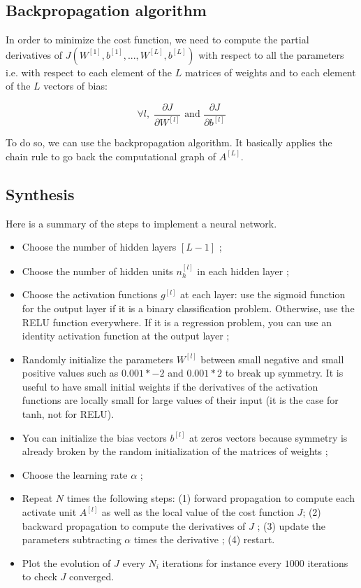 \documentclass[a4paper, 12pt]{article}
\begin{document}
\subsection{Backpropagation algorithm}

In order to minimize the cost function, we need to compute the partial derivatives of $J(W^{[1]}, b^{[1]}, ..., W^{[L]}, b^{[L]})$ with respect to all the parameters i.e. with respect to each element of the $L$ matrices of weights and to each element of the $L$ vectors of bias:

\begin{equation}
\forall l, \; \frac{\partial J}{\partial W^{[l]}} \text{ and } \frac{\partial J}{\partial b^{[l]}}
\end{equation}

To do so, we can use the backpropagation algorithm. It basically applies the chain rule to go back the computational graph of $A^{[L]}$.

\subsection{Synthesis}

Here is a summary of the steps to implement a neural network.

\begin{itemize}
\item Choose the number of hidden layers $[L-1]$ ;
\item Choose the number of hidden units $n^{[l]}_h$ in each hidden layer ;
\item Choose the activation functions $g^{[l]}$ at each layer: use the sigmoid function for the output layer if it is a binary classification problem. Otherwise, use the RELU function everywhere. If it is a regression problem, you can use an identity activation function at the output layer ;
\item Randomly initialize the parameters $W^{[l]}$ between small negative and small positive values such as $0.001 * -2$ and $0.001 * 2$ to break up symmetry. It is useful to have small initial weights if the derivatives of the activation functions are locally small for large values of their input (it is the case for tanh, not for RELU).
\item You can initialize the bias vectors $b^{[l]}$ at zeros vectors because symmetry is already broken by the random initialization of the matrices of weights ;
\item Choose the learning rate $\alpha$ ;
\item Repeat $N$ times the following steps: (1) forward propagation to compute each activate unit $A^{[l]}$ as well as the local value of the cost function $J$; (2) backward propagation to compute the derivatives of $J$ ; (3) update the parameters subtracting $\alpha$ times the derivative ; (4) restart.
\item Plot the evolution of $J$ every $N_{i}$ iterations for instance every $1 000$ iterations to check $J$ converged.
\end{itemize}
\end{document}
